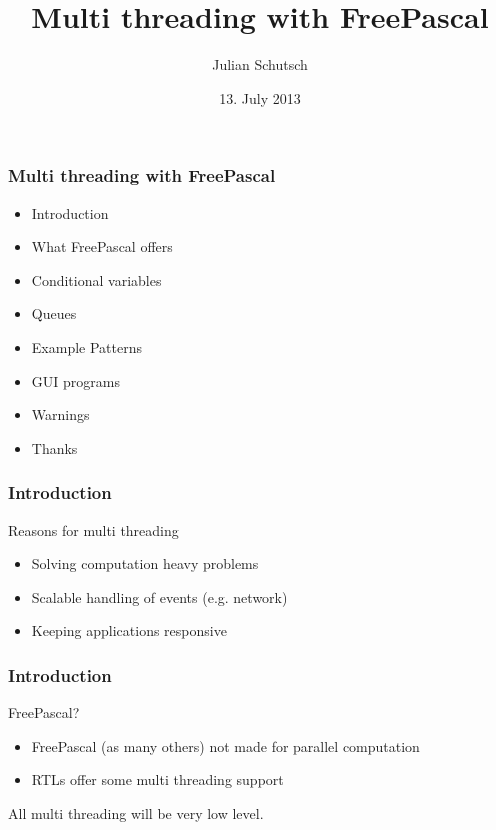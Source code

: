 \documentclass{beamer}
\title{Multi threading with FreePascal}
\author{Julian Schutsch}
\date{13. July 2013}
\begin{document}
\begin{frame}
\frametitle{Multi threading with FreePascal}
\begin{itemize}
 \item Introduction
 \item What FreePascal offers
 \item Conditional variables
 \item Queues
 \item Example Patterns
 \item GUI programs
 \item Warnings
 \item Thanks
\end{itemize}
\end{frame}

\begin{frame}
\frametitle{Introduction}
\begin{center}
Reasons for multi threading
\end{center}
\begin{itemize}
 \item Solving computation heavy problems
 \item Scalable handling of events (e.g. network)
 \item Keeping applications responsive
\end{itemize}
\end{frame}

\begin{frame}
\frametitle{Introduction}
\begin{center}
FreePascal?
\end{center}
\begin{itemize}
 \item FreePascal (as many others) not made for parallel computation
 \item RTLs offer some multi threading support
\end{itemize}
\vspace{1cm}
\begin{centering}
All multi threading will be very low level.\par
\end{centering}
\end{frame}
\end{document}
